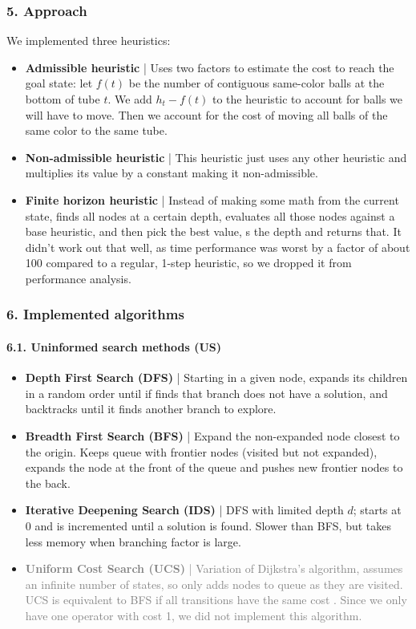 \documentclass{beamer}
\begin{document}
\begin{frame}
  \frametitle{5. Approach}
  
  We implemented three heuristics:
  \begin{itemize}
    \item \textbf{Admissible heuristic} | Uses two factors to estimate the cost to reach the goal state: let $f(t)$ be the number of contiguous same-color balls at the bottom of tube $t$. We add $h_t-f(t)$ to the heuristic to account for balls we will have to move. Then we account for the cost of moving all balls of the same color to the same tube.
    \item \textbf{Non-admissible heuristic} | This heuristic just uses any other heuristic and multiplies its value by a constant making it non-admissible.
    \item \textbf{Finite horizon heuristic} | Instead of making some math from the current state, finds all nodes at a certain depth, evaluates all those nodes against a base heuristic, and then pick the best value, s the depth and returns that.
    It didn't work out that well, as time performance was worst by a factor of about 100 compared to a regular, 1-step heuristic, so we dropped it from performance analysis.
  \end{itemize}
\end{frame}

\begin{frame}
\frametitle{6. Implemented algorithms}
\framesubtitle{6.1. Uninformed search methods (US)}

\begin{itemize}
  \item \textbf{Depth First Search (DFS)} | Starting in a given node, expands its children in a random order until if finds that branch does not have a solution, and backtracks until it finds another branch to explore. 
  
  \item \textbf{Breadth First Search (BFS)} |  Expand the non-expanded node closest to the origin. Keeps queue with frontier nodes (visited but not expanded), expands the node at the front of the queue and pushes new frontier nodes to the back.
  
  \item \textbf{Iterative Deepening Search (IDS)} | DFS with limited depth $d$; starts at $0$ and is incremented until a solution is found. Slower than BFS, but takes less memory when branching factor is large.
  
  \item \textcolor{gray}{\textbf{Uniform Cost Search (UCS)} | Variation of Dijkstra's algorithm, assumes an infinite number of states, so only adds nodes to queue as they are visited.
  UCS is equivalent to BFS if all transitions have the same cost \cite{javatpoint-uninformed}.
  Since we only have one operator with cost 1, we did not implement this algorithm.}
\end{itemize}
\end{frame}
\end{document}
